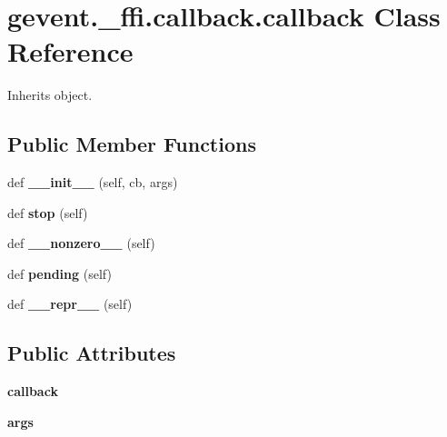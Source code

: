 \hypertarget{classgevent_1_1__ffi_1_1callback_1_1callback}{}\section{gevent.\+\_\+ffi.\+callback.\+callback Class Reference}
\label{classgevent_1_1__ffi_1_1callback_1_1callback}


Inherits object.

\subsection*{Public Member Functions}
\begin{DoxyCompactItemize}
\item 
\mbox{\label{classgevent_1_1__ffi_1_1callback_1_1callback_abb852db5a9fba1379a06d1ca6a590f6b}} 
def {\bfseries \+\_\+\+\_\+init\+\_\+\+\_\+} (self, cb, args)
\item 
\mbox{\label{classgevent_1_1__ffi_1_1callback_1_1callback_a2518d387fa8f6bab80da53e3e459ad58}} 
def {\bfseries stop} (self)
\item 
\mbox{\label{classgevent_1_1__ffi_1_1callback_1_1callback_ac2e08abb24478324cdafd992a8dd53cc}} 
def {\bfseries \+\_\+\+\_\+nonzero\+\_\+\+\_\+} (self)
\item 
\mbox{\label{classgevent_1_1__ffi_1_1callback_1_1callback_a32fa39656bbd0dad405ff0b77d78fb65}} 
def {\bfseries pending} (self)
\item 
\mbox{\label{classgevent_1_1__ffi_1_1callback_1_1callback_a3bea91fe031166dbe193bddcbb4fbbbd}} 
def {\bfseries \+\_\+\+\_\+repr\+\_\+\+\_\+} (self)
\end{DoxyCompactItemize}
\subsection*{Public Attributes}
\begin{DoxyCompactItemize}
\item 
\mbox{\label{classgevent_1_1__ffi_1_1callback_1_1callback_a7d74ffe29fc1dc607538e6c535c86b6c}} 
{\bfseries callback}
\item 
\mbox{\label{classgevent_1_1__ffi_1_1callback_1_1callback_a5124047678e6666371407d6bcc136f08}} 
{\bfseries args}
\end{DoxyCompactItemize}

